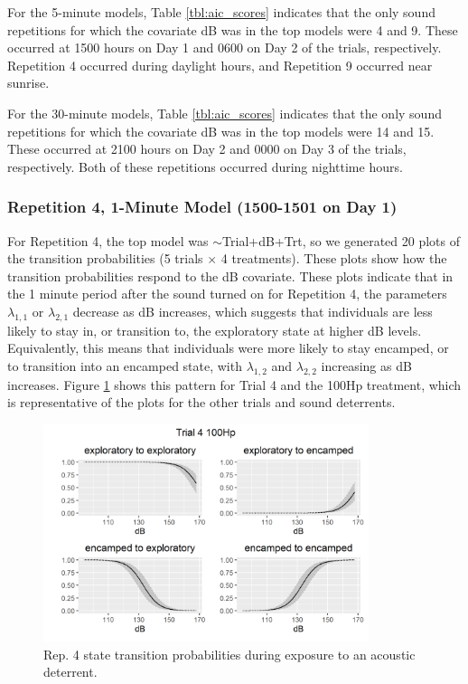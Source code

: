 \documentclass[12pt]{article}
\begin{document}
	For the 5-minute models, Table \ref{tbl:aic_scores} indicates that the only sound repetitions for which the covariate dB was in the top models were 4 and 9. These occurred at 1500 hours on Day 1 and 0600 on Day 2 of the trials, respectively. Repetition 4 occurred during daylight hours, and Repetition 9 occurred near sunrise.
	
	For the 30-minute models, Table \ref{tbl:aic_scores} indicates that the only sound repetitions for which the covariate dB was in the top models were 14 and 15. These occurred at 2100 hours on Day 2 and 0000 on Day 3 of the trials, respectively. Both of these repetitions occurred during nighttime hours.
	
	\subsubsection{Repetition 4, 1-Minute Model (1500-1501 on Day 1)}
	
	For Repetition 4, the top model was $\sim$Trial+dB+Trt, so we generated 20 plots of the transition probabilities (5 trials $\times$ 4 treatments). These plots show how the transition probabilities respond to the dB covariate. These plots indicate that in the 1 minute period after the sound turned on for Repetition 4, the parameters $\lambda_{1, 1}$ or $\lambda_{2, 1}$ decrease as dB increases, which suggests that individuals are less likely to stay in, or transition to, the exploratory state at higher dB levels. Equivalently, this means that individuals were more likely to stay encamped, or to transition into an encamped state, with $\lambda_{1, 2}$ and $\lambda_{2, 2}$ increasing as dB increases. Figure \ref{img:rep4_1min_trans_tmnt} shows this pattern for Trial 4 and the 100Hp treatment, which is representative of the plots for the other trials and sound deterrents.
	
	\begin{figure}
		\centering
		\includegraphics[width=0.85\textwidth]{trans_rep_4_trial_4_100Hp.png}
		\caption{Rep. 4 state transition probabilities during exposure to an acoustic deterrent.}
		\label{img:rep4_1min_trans_tmnt}
	\end{figure}
	
\end{document}
